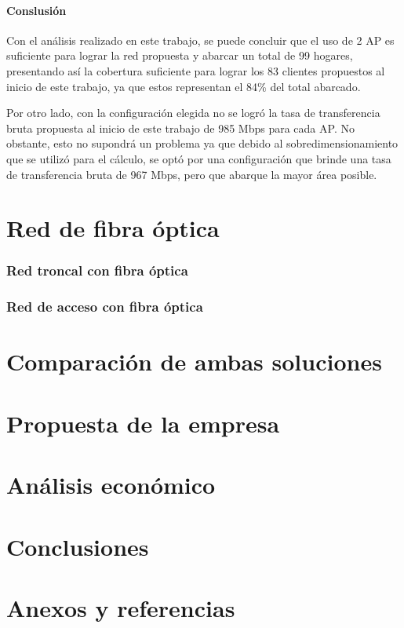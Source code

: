 \documentclass[11pt,a4paper]{article}
\begin{document}
\clearpage
\subsection{Conslusión}

Con el análisis realizado en este trabajo, se puede concluir que el uso de 2 AP es suficiente para lograr la red propuesta y abarcar un total de 99 hogares, presentando así la cobertura suficiente para lograr los 83 clientes propuestos al inicio de este trabajo, ya que estos representan el 84\% del total abarcado. 

Por otro lado, con la configuración elegida no se logró la tasa de transferencia bruta propuesta al inicio de este trabajo de 985 Mbps para cada AP. No obstante, esto no supondrá un problema ya que debido al sobredimensionamiento que se utilizó para el cálculo, se optó por una configuración que brinde una tasa de transferencia bruta de 967 Mbps, pero que abarque la mayor área posible.


\clearpage
\part{Red de fibra óptica}

\section{Red troncal con fibra óptica}







\section{Red de acceso con fibra óptica}



\part{Comparación de ambas soluciones}


\part{Propuesta de la empresa}

\part{Análisis económico}

\part{Conclusiones}

\part{Anexos y referencias}
\end{document}
